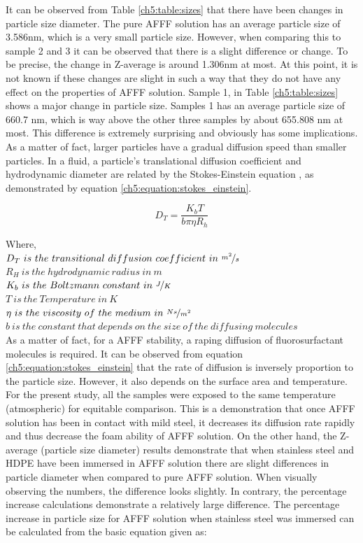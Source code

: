\documentclass[12pt]{report}
\begin{document}
It can be observed from Table \ref{ch5:table:sizes} that there have been changes in particle size diameter. The pure AFFF solution has an average particle size of 3.586nm, which is a very small particle size. However, when comparing this to sample 2 and 3 it can be observed that there is a slight difference or change. To be precise, the change in Z-average is around 1.306nm at most. At this point, it is not known if these changes are slight in such a way that they do not have any effect on the properties of AFFF solution. Sample 1, in Table \ref{ch5:table:sizes} shows a major change in particle size. Samples 1 has an average particle size of 660.7 nm, which is way above the other three samples by about 655.808 nm at most. This difference is extremely surprising and obviously has some implications. As a matter of fact, larger particles have a gradual diffusion speed than smaller particles. In a fluid, a particle's translational diffusion coefficient and hydrodynamic diameter are related by the Stokes-Einstein equation \cite{lin1991handbook}, as demonstrated by equation \ref{ch5:equation:stokes_einstein}.

\begin{equation}
    D_T=\frac{K_bT}{b\pi \eta R_h}
    \label{ch5:equation:stokes_einstein}
\end{equation}

\noindent Where, \\
$D_T\ is\ the\ transitional\ diffusion\ coefficient\ in\ \nicefrac{m^2}{s}$ \\
$R_H\ is\ the\ hydrodynamic\ radius\ in\ m$ \\
$K_b\ is\ the\ Boltzmann\ constant\ in\ \nicefrac{J}{K}$ \\
$T\ is\ the\ Temperature\ in\ K$ \\
$\eta\ is\ the\ viscosity\ of\ the\ medium\ in\ \nicefrac{Ns}{m^2}$ \\
$b\ is\ the\ constant\ that\ depends\ on\ the\ size\ of\ the\ diffusing\ molecules$ \\

As a matter of fact, for a AFFF stability, a raping diffusion of fluorosurfactant molecules is required. It can be observed from equation \ref{ch5:equation:stokes_einstein} that the rate of diffusion is inversely proportion to the particle size. However, it also depends on the surface area and temperature. For the present study, all the samples were exposed to the same temperature (atmospheric) for equitable comparison. This is a demonstration that once AFFF solution has been in contact with mild steel, it decreases its diffusion rate rapidly and thus decrease the foam ability of AFFF solution.  On the other hand, the Z-average (particle size diameter) results demonstrate that when stainless steel and HDPE have been immersed in AFFF solution there are slight differences in particle diameter when compared to pure AFFF solution. When visually observing the numbers, the difference looks slightly. In contrary, the percentage increase calculations demonstrate a relatively large difference. The percentage increase in particle size for AFFF solution when stainless steel was immersed can be calculated from the basic equation given as: 
\end{document}
